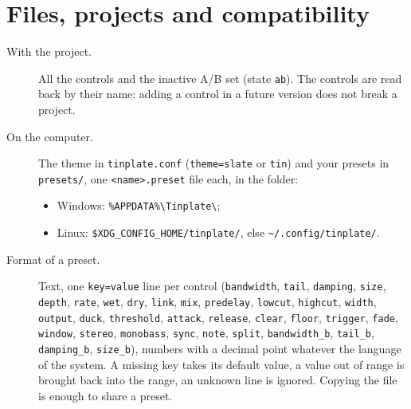 \documentclass[a4paper,11pt]{article}
\begin{document}
\section{Files, projects and compatibility}\label{sec:files}

\begin{description}
\item[With the project.] All the controls and the inactive A/B set (state \texttt{ab}). The
  controls are read back by their name: adding a control in a future version does not break a
  project.
\item[On the computer.] The theme in \texttt{tinplate.conf} (\texttt{theme=slate} or
  \texttt{tin}) and your presets in \texttt{presets/}, one \texttt{<name>.preset} file each, in
  the folder:
  \begin{itemize}
  \item Windows: \verb|%APPDATA%\Tinplate\|;
  \item Linux: \verb|$XDG_CONFIG_HOME/tinplate/|, else \verb|~/.config/tinplate/|.
  \end{itemize}
\item[Format of a preset.] Text, one \texttt{key=value} line per control (\texttt{bandwidth},
  \texttt{tail}, \texttt{damping}, \texttt{size}, \texttt{depth}, \texttt{rate}, \texttt{wet},
  \texttt{dry}, \texttt{link}, \texttt{mix}, \texttt{predelay}, \texttt{lowcut},
  \texttt{highcut}, \texttt{width}, \texttt{output}, \texttt{duck}, \texttt{threshold},
  \texttt{attack}, \texttt{release}, \texttt{clear}, \texttt{floor}, \texttt{trigger},
  \texttt{fade}, \texttt{window}, \texttt{stereo}, \texttt{monobass}, \texttt{sync},
  \texttt{note}, \texttt{split}, \texttt{bandwidth\_b}, \texttt{tail\_b}, \texttt{damping\_b},
  \texttt{size\_b}), numbers with a decimal point whatever the language of the system. A missing
  key takes its default value, a value out of range is brought back into the range, an unknown
  line is ignored. Copying the file is enough to share a preset.
\end{description}

\end{document}
